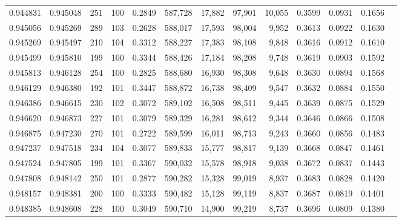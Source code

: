 \begin{tabular}{rrrrrrrrrrrrr}
0.944831 & 0.945048 &   251 & 100 &                                     0.2849 & 587,728 &  17,882 &  97,901 &  10,055 & 0.3599 & 0.0931 & 0.1656 \\
0.945056 & 0.945269 &   289 & 103 &                                     0.2628 & 588,017 &  17,593 &  98,004 &   9,952 & 0.3613 & 0.0922 & 0.1630 \\
0.945269 & 0.945497 &   210 & 104 &                                     0.3312 & 588,227 &  17,383 &  98,108 &   9,848 & 0.3616 & 0.0912 & 0.1610 \\
0.945499 & 0.945810 &   199 & 100 &                                     0.3344 & 588,426 &  17,184 &  98,208 &   9,748 & 0.3619 & 0.0903 & 0.1592 \\
0.945813 & 0.946128 &   254 & 100 &                                     0.2825 & 588,680 &  16,930 &  98,308 &   9,648 & 0.3630 & 0.0894 & 0.1568 \\
0.946129 & 0.946380 &   192 & 101 &                                     0.3447 & 588,872 &  16,738 &  98,409 &   9,547 & 0.3632 & 0.0884 & 0.1550 \\
0.946386 & 0.946615 &   230 & 102 &                                     0.3072 & 589,102 &  16,508 &  98,511 &   9,445 & 0.3639 & 0.0875 & 0.1529 \\
0.946620 & 0.946873 &   227 & 101 &                                     0.3079 & 589,329 &  16,281 &  98,612 &   9,344 & 0.3646 & 0.0866 & 0.1508 \\
0.946875 & 0.947230 &   270 & 101 &                                     0.2722 & 589,599 &  16,011 &  98,713 &   9,243 & 0.3660 & 0.0856 & 0.1483 \\
0.947237 & 0.947518 &   234 & 104 &                                     0.3077 & 589,833 &  15,777 &  98,817 &   9,139 & 0.3668 & 0.0847 & 0.1461 \\
0.947524 & 0.947805 &   199 & 101 &                                     0.3367 & 590,032 &  15,578 &  98,918 &   9,038 & 0.3672 & 0.0837 & 0.1443 \\
0.947808 & 0.948142 &   250 & 101 &                                     0.2877 & 590,282 &  15,328 &  99,019 &   8,937 & 0.3683 & 0.0828 & 0.1420 \\
0.948157 & 0.948381 &   200 & 100 &                                     0.3333 & 590,482 &  15,128 &  99,119 &   8,837 & 0.3687 & 0.0819 & 0.1401 \\
0.948385 & 0.948608 &   228 & 100 &                                     0.3049 & 590,710 &  14,900 &  99,219 &   8,737 & 0.3696 & 0.0809 & 0.1380 \\

\end{tabular}

